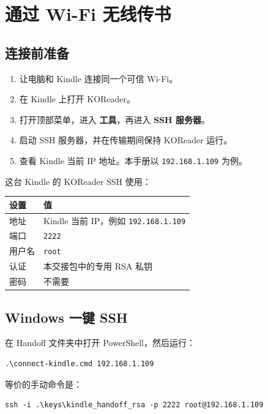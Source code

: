 \documentclass[10pt,a4paper]{article}
\begin{document}
\section{通过 Wi-Fi 无线传书}

\subsection{连接前准备}

\begin{enumerate}
  \item 让电脑和 Kindle 连接同一个可信 Wi-Fi。
  \item 在 Kindle 上打开 KOReader。
  \item 打开顶部菜单，进入 \textbf{工具}，再进入 \textbf{SSH 服务器}。
  \item 启动 SSH 服务器，并在传输期间保持 KOReader 运行。
  \item 查看 Kindle 当前 IP 地址。本手册以 \texttt{192.168.1.109} 为例。
\end{enumerate}

这台 Kindle 的 KOReader SSH 使用：

\begin{longtable}{@{}p{}p{}@{}}
\toprule
\textbf{设置} & \textbf{值} \\
\midrule
地址 & Kindle 当前 IP，例如 \texttt{192.168.1.109} \\
端口 & \texttt{2222} \\
用户名 & \texttt{root} \\
认证 & 本交接包中的专用 RSA 私钥 \\
密码 & 不需要 \\
\bottomrule
\end{longtable}

\subsection{Windows 一键 SSH}

在 Handoff 文件夹中打开 PowerShell，然后运行：

\begin{Verbatim}[fontsize=\small]
.\connect-kindle.cmd 192.168.1.109
\end{Verbatim}

等价的手动命令是：

\begin{Verbatim}[fontsize=\small]
ssh -i .\keys\kindle_handoff_rsa -p 2222 root@192.168.1.109
\end{Verbatim}
\end{document}
